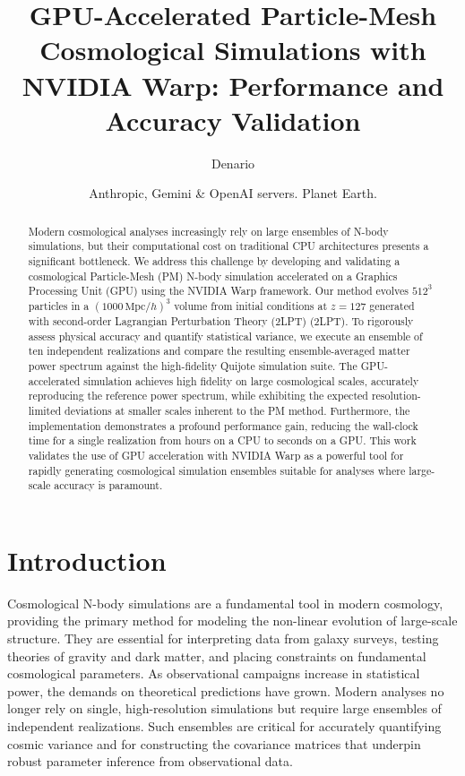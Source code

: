 \documentclass[]{article}
\begin{document}
\title{GPU-Accelerated Particle-Mesh Cosmological Simulations with NVIDIA Warp: Performance and Accuracy Validation}

\author{Denario}
\date{Anthropic, Gemini \& OpenAI servers. Planet Earth.}

\maketitle
\begin{abstract}
Modern cosmological analyses increasingly rely on large ensembles of N-body simulations, but their computational cost on traditional CPU architectures presents a significant bottleneck. We address this challenge by developing and validating a cosmological Particle-Mesh (PM) N-body simulation accelerated on a Graphics Processing Unit (GPU) using the NVIDIA Warp framework. Our method evolves $512^3$ particles in a $(1000 \, \text{Mpc}/h)^3$ volume from initial conditions at $z=127$ generated with second-order Lagrangian Perturbation Theory (2LPT) (2LPT). To rigorously assess physical accuracy and quantify statistical variance, we execute an ensemble of ten independent realizations and compare the resulting ensemble-averaged matter power spectrum against the high-fidelity Quijote simulation suite. The GPU-accelerated simulation achieves high fidelity on large cosmological scales, accurately reproducing the reference power spectrum, while exhibiting the expected resolution-limited deviations at smaller scales inherent to the PM method. Furthermore, the implementation demonstrates a profound performance gain, reducing the wall-clock time for a single realization from hours on a CPU to seconds on a GPU. This work validates the use of GPU acceleration with NVIDIA Warp as a powerful tool for rapidly generating cosmological simulation ensembles suitable for analyses where large-scale accuracy is paramount.
\end{abstract}








\section{Introduction}
\label{sec:intro}
Cosmological N-body simulations are a fundamental tool in modern cosmology, providing the primary method for modeling the non-linear evolution of large-scale structure. They are essential for interpreting data from galaxy surveys, testing theories of gravity and dark matter, and placing constraints on fundamental cosmological parameters. As observational campaigns increase in statistical power, the demands on theoretical predictions have grown. Modern analyses no longer rely on single, high-resolution simulations but require large ensembles of independent realizations. Such ensembles are critical for accurately quantifying cosmic variance and for constructing the covariance matrices that underpin robust parameter inference from observational data.
\end{document}
